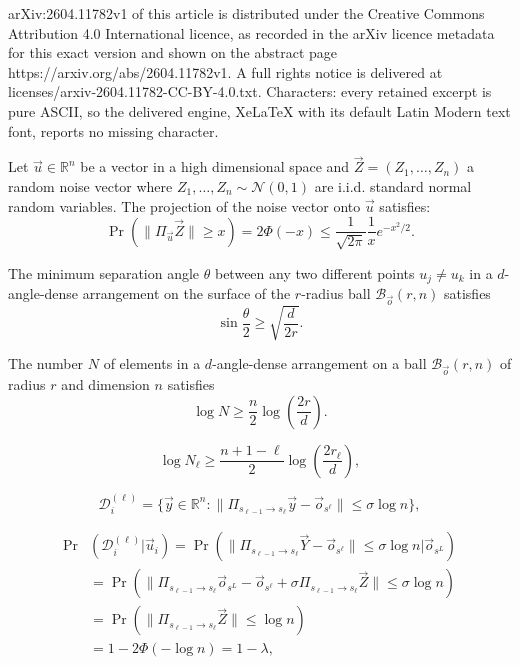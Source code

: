 \documentclass[10pt,a4paper]{amsart}
\newcommand{\RR}{\mathbb{R}}
\newcommand{\cB}{\mathcal{B}}
\newcommand{\cD}{\mathcal{D}}
\newcommand{\cN}{\mathcal{N}}
\begin{document}
arXiv:2604.11782v1 of this article is distributed under the Creative Commons Attribution 4.0 International licence, as recorded in the arXiv licence metadata for this exact version and shown on the abstract page https://arxiv.org/abs/2604.11782v1. A full rights notice is delivered at licenses/arxiv-2604.11782-CC-BY-4.0.txt. Characters: every retained excerpt is pure ASCII, so the delivered engine, XeLaTeX with its default Latin Modern text font, reports no missing character.
\begin{proposition}\label{prop:projection}
    Let $\vec{u}\in\RR^n$ be a vector in a high dimensional space and $\vec{Z}=(Z_1,\dots,Z_n)$ a random noise vector where $Z_1,\dots,Z_n\sim\cN(0,1)$ are i.i.d. standard normal random variables. The projection of the noise vector onto  $\vec{u}$ satisfies:
    \[
    \Pr\left(\|\Pi_{\vec{u}}\vec{Z}\|\geq x\right)=2\Phi(-x)\leq\frac{1}{\sqrt{2\pi}}\frac{1}{x}e^{-x^2/2}.
    \]
\end{proposition}

\begin{lemma}\label{lemma:angle}
The minimum separation angle $\theta$ between any two different points $u_j\neq u_k$ in a $d$-angle-dense arrangement on the surface of the $r$-radius ball $\cB_{\vec o}(r,n)$ satisfies
\[
\sin\frac{\theta}{2} \geq \sqrt{\frac{d}{2r}} .
\]
\end{lemma}

\begin{proposition}\label{prop:size_bound}
The number $N$ of elements in a $d$-angle-dense arrangement on a ball $\cB_{\vec o}(r,n)$ of radius $r$ and dimension $n$ satisfies
\[
\log N \geq \frac{n}{2}\log\left(\frac{2r}{d}\right).
\]
\end{proposition}

\begin{equation}\label{eq:encoding_code_size}
\log N_\ell\geq\frac{n+1-\ell}{2}\log \left(\frac{2r_\ell}{d}\right),
\end{equation}

\begin{equation}\label{eq:decoder}
\cD_{i}^{(\ell)}=\{\vec{y}\in\RR^n:\|\Pi_{s_{\ell-1}\to s_{\ell}}\vec{y}-\vec{o}_{s^\ell}\|\leq\sigma\log n\},
\end{equation}

\begin{align}
\!\!\Pr&(\cD_i^{(\ell)}|\vec{u}_i)=\Pr\left(\|\Pi_{s_{\ell-1}\to s_{\ell}}\vec{Y}-\vec{o}_{s^\ell}\|\leq\sigma\log n|\vec{o}_{s^{L}}\right)\nonumber \\
&=\Pr\left(\|\Pi_{s_{\ell-1}\to s_{\ell}}\vec{o}_{s^{L}}-\vec{o}_{s^\ell}+\sigma \Pi_{s_{\ell-1}\to s_{\ell}}\vec{Z}\|\leq \sigma\log n\right)\nonumber\\
&=\Pr\left(\|\Pi_{s_{\ell-1}\to s_{\ell}}\vec{Z}\|\leq\log n\right)\label{eq:layer_error1}\\
&=1-2\Phi(-\log n)=1-\lambda,\nonumber
\end{align}
\end{document}
